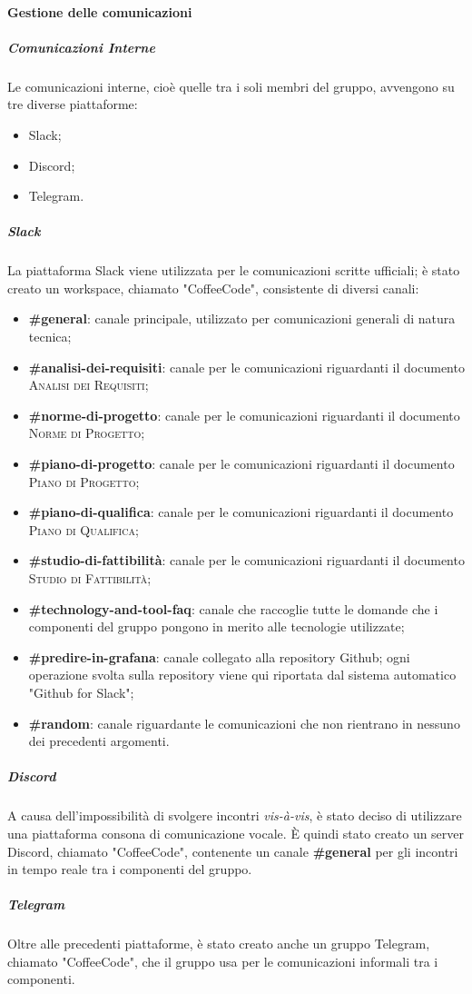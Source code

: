 \documentclass[../norme-di-progetto.tex]{subfiles}
\begin{document}
\paragraph{Gestione delle comunicazioni}
\subparagraph{Comunicazioni Interne}
Le comunicazioni interne, cioè quelle tra i soli membri del gruppo, avvengono su tre diverse piattaforme:
\begin{itemize}
  \item Slack;
  \item Discord;
  \item Telegram.
\end{itemize}
\subparagraph*{Slack}
La piattaforma Slack viene utilizzata per le comunicazioni scritte ufficiali; è stato creato un workspace, chiamato "CoffeeCode", consistente di diversi canali:
\begin{itemize}
  \item \textbf{\#general}: canale principale, utilizzato per comunicazioni generali di natura tecnica;
  \item \textbf{\#analisi-dei-requisiti}: canale per le comunicazioni riguardanti il documento \textsc{Analisi dei Requisiti};
  \item \textbf{\#norme-di-progetto}: canale per le comunicazioni riguardanti il documento \textsc{Norme di Progetto};
  \item \textbf{\#piano-di-progetto}: canale per le comunicazioni riguardanti il documento \textsc{Piano di Progetto};
  \item \textbf{\#piano-di-qualifica}: canale per le comunicazioni riguardanti il documento \textsc{Piano di Qualifica};
  \item \textbf{\#studio-di-fattibilità}: canale per le comunicazioni riguardanti il documento \textsc{Studio di Fattibilità};
  \item \textbf{\#technology-and-tool-faq}: canale che raccoglie tutte le domande che i componenti del gruppo pongono in merito alle tecnologie utilizzate;
  \item \textbf{\#predire-in-grafana}: canale collegato alla repository Github; ogni operazione svolta sulla repository viene qui riportata dal sistema automatico "Github for Slack";
  \item \textbf{\#random}: canale riguardante le comunicazioni che non rientrano in nessuno dei precedenti argomenti.
\end{itemize}
\subparagraph*{Discord}
A causa dell'impossibilità di svolgere incontri \textit{vis-à-vis}, è stato deciso di utilizzare una piattaforma consona di comunicazione vocale. È quindi stato creato un server Discord, chiamato "CoffeeCode", contenente un canale \textbf{\#general} per gli incontri in tempo reale tra i componenti del gruppo.
\subparagraph*{Telegram}
Oltre alle precedenti piattaforme, è stato creato anche un gruppo Telegram, chiamato "CoffeeCode", che il gruppo usa per le comunicazioni informali tra i componenti.
\end{document}
